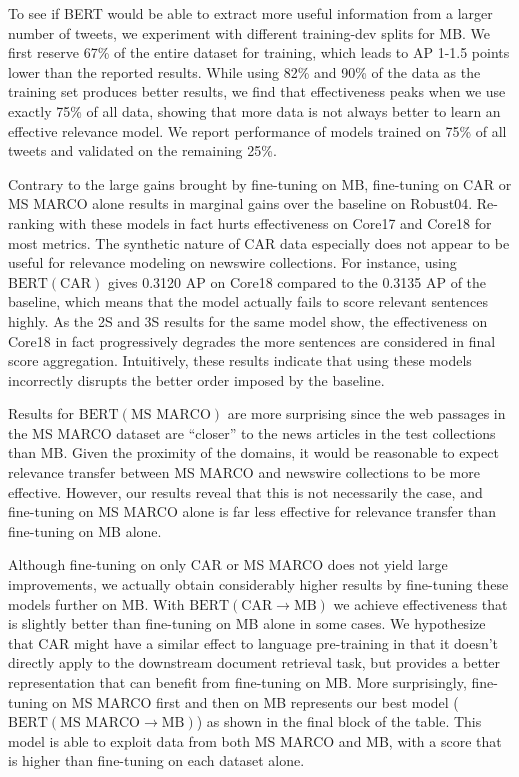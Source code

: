 To see if BERT would be able to extract more useful information from a larger number of tweets, we experiment with different training-dev splits for MB.
We first reserve 67\% of the entire dataset for training, which leads to AP 1-1.5 points lower than the reported results.
While using 82\% and 90\% of the data as the training set produces better results, we find that effectiveness peaks when we use exactly 75\% of all data, showing that more data is not always better to learn an effective relevance model.
We report performance of models trained on 75\% of all tweets and validated on the remaining 25\%.

Contrary to the large gains brought by fine-tuning on MB, fine-tuning on CAR or MS MARCO alone results in marginal gains over the baseline on Robust04.
Re-ranking with these models in fact hurts effectiveness on Core17 and Core18 for most metrics.
The synthetic nature of CAR data especially does not appear to be useful for relevance modeling on newswire collections.
For instance, using $ \textrm{BERT}(\textrm{CAR}) $ gives 0.3120 AP on Core18 compared to the 0.3135 AP of the baseline, which means that the model actually fails to score relevant sentences highly.
As the 2S and 3S results for the same model show, the effectiveness on Core18 in fact progressively degrades the more sentences are considered in final score aggregation.
Intuitively, these results indicate that using these models incorrectly disrupts the better order imposed by the baseline.

Results for $ \textrm{BERT}(\textrm{MS MARCO}) $ are more surprising since the web passages in the MS MARCO dataset are ``closer'' to the news articles in the test collections than MB.
Given the proximity of the domains, it would be reasonable to expect relevance transfer between MS MARCO and newswire collections to be more effective.
However, our results reveal that this is not necessarily the case, and fine-tuning on MS MARCO alone is far less effective for relevance transfer than fine-tuning on MB alone.

Although fine-tuning on only CAR or MS MARCO does not yield large improvements, we actually obtain considerably higher results by fine-tuning these models further on MB.
With $ \textrm{BERT}(\textrm{CAR}\rightarrow\textrm{MB}) $ we achieve effectiveness that is slightly better than fine-tuning on MB alone in some cases.
We hypothesize that CAR might have a similar effect to language pre-training in that it doesn't directly apply to the downstream document retrieval task, but provides a better representation that can benefit from fine-tuning on MB.
More surprisingly, fine-tuning on MS MARCO first and then on MB represents our best model ($ \textrm{BERT}(\textrm{MS MARCO}\rightarrow\textrm{MB}) $) as shown in the final block of the table.
This model is able to exploit data from both MS MARCO and MB, with a score that is higher than fine-tuning on each dataset alone.

